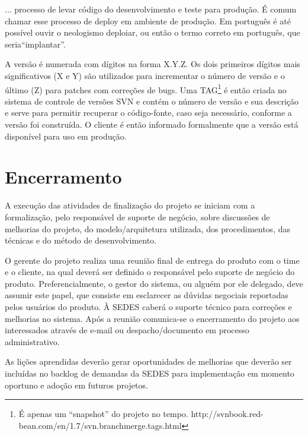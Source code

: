 \begin{citacao}
... processo de levar código do desenvolvimento e teste para produção. É comum chamar esse processo de deploy em ambiente de
produção. Em português é até possível ouvir o neologismo deploiar, ou então o termo correto em português, que seria“implantar”. \cite[p.~19]{Sato2014}
\end{citacao}

A versão é numerada com dígitos na forma X.Y.Z. Os dois primeiros dígitos mais significativos (X e Y) são utilizados para incrementar o número de versão e o último (Z) para patches com correções de bugs. Uma  TAG\footnote{ É apenas um “snapshot” do projeto no tempo. http://svnbook.red-bean.com/en/1.7/svn.branchmerge.tags.html} é então criada no sistema de controle de versões SVN e contém o número de versão e sua descrição e serve para permitir recuperar o código-fonte, caso seja necessário, conforme a versão foi construída. O cliente é então informado formalmente que a versão está disponível para uso em produção.

\section{Encerramento}
\label{sec:atividadesRealizadasEncerramento}

A execução das atividades de finalização do projeto se iniciam com a formalização, pelo responsável de suporte de negócio, sobre discussões de melhorias do projeto, do modelo/arquitetura utilizada, dos  procedimentos, das técnicas e do método de desenvolvimento. 

O gerente do projeto realiza uma reunião final de entrega do produto com o time e o cliente, na qual deverá ser definido o responsável pelo suporte de negócio do produto. Preferencialmente, o gestor do sistema, ou alguém por ele delegado, deve assumir este papel, que consiste em esclarecer as dúvidas negociais reportadas pelos usuários do produto. À SEDES caberá o suporte técnico para correções e melhorias no sistema. Após a reunião comunica-se o encerramento do projeto aos interessados através de e-mail ou despacho/documento em processo administrativo.

As lições aprendidas deverão gerar oportunidades de melhorias que deverão ser incluídas no backlog de demandas da SEDES para implementação em momento oportuno e adoção em futuros projetos.